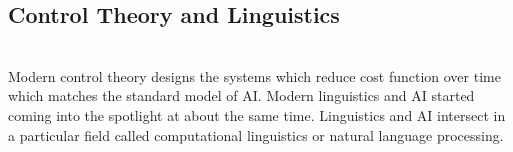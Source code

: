 \documentclass{article}
\begin{document}
\subsection{Control Theory and Linguistics}
\begin{paragraph}
\\
Modern control theory designs the systems which reduce cost function over time which matches the standard model of AI. Modern linguistics and AI started coming into the spotlight at about the same time. Linguistics and AI intersect in a particular field called computational linguistics or natural language processing.
\end{paragraph}
\end{document}
